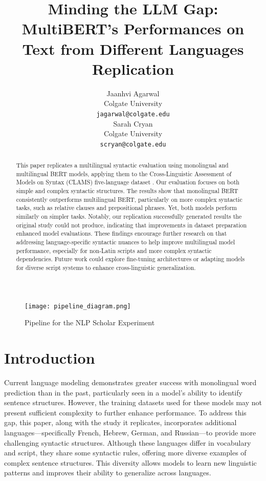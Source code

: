 \documentclass[11pt]{article}
\title{Minding the LLM Gap: MultiBERT's Performances on Text from Different Languages Replication}
\author{
  \begin{minipage}[t]{0.45\textwidth}
    \centering
    Jaanhvi Agarwal \\
    Colgate University \\
    \texttt{jagarwal@colgate.edu}
  \end{minipage}
  \hfill
  \begin{minipage}[t]{0.45\textwidth}
    \centering
    Sarah Cryan \\
    Colgate University \\
    \texttt{scryan@colgate.edu}
  \end{minipage}
}
\begin{document}
\maketitle

\begin{abstract}





This paper replicates a multilingual syntactic evaluation using monolingual and multilingual BERT models, applying them to the Cross-Linguistic Assessment of Models on Syntax (CLAMS) five-language dataset \cite{clams}. Our evaluation focuses on both simple and complex syntactic structures. The results show that monolingual BERT consistently outperforms multilingual BERT, particularly on more complex syntactic tasks, such as relative clauses and prepositional phrases. Yet, both models perform similarly on simpler tasks. Notably, our replication successfully generated results the original study could not produce, indicating that improvements in dataset preparation enhanced model evaluations. These findings encourage further research on that addressing language-specific syntactic nuances to help improve multilingual model performance, especially for non-Latin scripts \cite{Arivazhagan2019MassivelyMN} and more complex syntactic dependencies. Future work could explore fine-tuning architectures or adapting models for diverse script systems \cite{clark2022canine} to enhance cross-linguistic generalization.
\end{abstract}

\begin{figure}[t]
    \centering
    \texttt{[image: pipeline\_diagram.png]}
    \caption{Pipeline for the NLP Scholar Experiment}
    \label{fig:pipeline}
\end{figure}

\section{Introduction}
Current language modeling demonstrates greater success with monolingual word prediction than in the past, particularly seen in a model’s ability to identify sentence structures. However, the training datasets used for these models may not present sufficient complexity to further enhance performance. To address this gap, this paper, along with the study it replicates, incorporates additional languages—specifically French, Hebrew, German, and Russian—to provide more challenging syntactic structures.  Although these languages differ in vocabulary and script, they share some syntactic rules, offering more diverse examples of complex sentence structures. This diversity allows models to learn new linguistic patterns and improves their ability to generalize across languages. 
\end{document}
